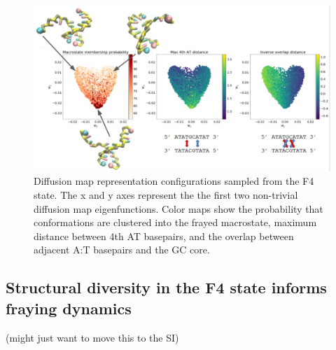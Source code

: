 \documentclass[journal=jpcbfk,manuscript=article]{achemso}
\begin{document}
\begin{figure}[ht!]
	\begin{center}
        \includegraphics[width=450, scale=1]{Fig8.pdf}
        \caption{Diffusion map representation configurations sampled from the F4 state. The x and y axes represent the the first two non-trivial diffusion map eigenfunctions. Color maps show the probability that conformations are clustered into the frayed macrostate, maximum distance between 4th AT basepairs, and the overlap between adjacent A:T basepairs and the GC core.}
        \label{fig:GC-core_dmaps}
	\end{center}
\end{figure}

\subsection{Structural diversity in the F4 state informs fraying dynamics} 
(might just want to move this to the SI)

\end{document}
